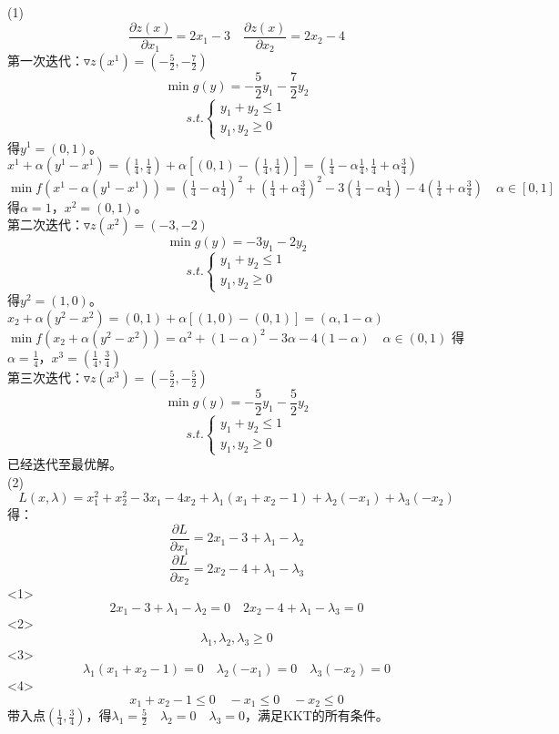 \documentclass[12pt]{article}
\begin{document}
\section{}
\noindent
(1)
\[\frac{\partial z(x)}{\partial x_1}=2x_1-3 \quad \frac{\partial z(x)}{\partial x_2}=2x_2-4\]
第一次迭代：$\triangledown z(x^1)=(-\frac{5}{2},-\frac{7}{2})$
\[ \min g(y)=-\frac{5}{2}y_1-\frac{7}{2}y_2 \]
\begin{equation*}s.t.
\left\{
    \begin{array}{l}
        y_1+y_2 \leq 1 \\
        y_1,y_2 \geq 0
    \end{array}
\right.
\end{equation*}
得$y^1=(0,1)$。$x^1+\alpha (y^1-x^1)=(\frac{1}{4},\frac{1}{4})+\alpha [(0,1)-(\frac{1}{4},\frac{1}{4})]
=(\frac{1}{4}-\alpha \frac{1}{4},\frac{1}{4}+\alpha \frac{3}{4})$\\
$\min f(x^1-\alpha (y^1-x^1))=(\frac{1}{4}-\alpha \frac{1}{4})^2+(\frac{1}{4}+\alpha \frac{3}{4})^2-3(\frac{1}{4}-\alpha \frac{1}{4})-4(\frac{1}{4}+\alpha \frac{3}{4}) \quad \alpha \in [0,1]$\\
得$\alpha =1$，$x^2=(0,1)$。\\
第二次迭代：$\triangledown z(x^2)=(-3,-2)$\\
\[ \min g(y)=-3y_1-2y_2 \]
\begin{equation*}s.t.
\left\{
    \begin{array}{l}
        y_1+y_2 \leq 1 \\
        y_1,y_2 \geq 0
    \end{array}
\right.
\end{equation*}
得$y^2=(1,0)$。$x_2+\alpha (y^2-x^2)=(0,1)+\alpha [(1,0)-(0,1)]=(\alpha ,1-\alpha)$\\
$\min f(x_2+\alpha (y^2-x^2))=\alpha ^2+(1-\alpha)^2-3\alpha -4(1-\alpha)\quad \alpha \in (0,1)$
得$\alpha=\frac{1}{4}$，$x^3=(\frac{1}{4},\frac{3}{4})$\\
第三次迭代：$\triangledown z(x^3)=(-\frac{5}{2},-\frac{5}{2})$ \\
\[ \min g(y)=-\frac{5}{2}y_1-\frac{5}{2}y_2 \]
\begin{equation*}s.t.
\left\{
    \begin{array}{l}
        y_1+y_2 \leq 1 \\
        y_1,y_2 \geq 0
    \end{array}
\right.
\end{equation*}
已经迭代至最优解。\\
(2)
\[L(x,\lambda)=x_1^2+x_2^2-3x_1-4x_2+\lambda _1(x_1+x_2-1)+\lambda _2(-x_1)+\lambda _3(-x_2)\]
得：
\[\frac{\partial L}{\partial x_1}=2x_1-3+\lambda _1-\lambda _2\]
\[\frac{\partial L}{\partial x_2}=2x_2-4+\lambda _1-\lambda _3\]
<1>
\[2x_1-3+\lambda _1-\lambda _2=0 \quad 2x_2-4+\lambda _1-\lambda _3=0\]
<2>
\[\lambda _1,\lambda _2,\lambda _3 \geq 0\]
<3>
\[\lambda _1(x_1+x_2-1)=0 \quad \lambda _2(-x_1)=0 \quad \lambda _3(-x_2)=0\]
<4>
\[x_1+x_2-1 \leq 0 \quad -x_1 \leq 0 \quad -x_2 \leq 0\]
带入点$(\frac{1}{4},\frac{3}{4})$，得$\lambda _1=\frac{5}{2} \quad \lambda _2=0 \quad \lambda _3=0$，满足KKT的所有条件。
\end{document}
